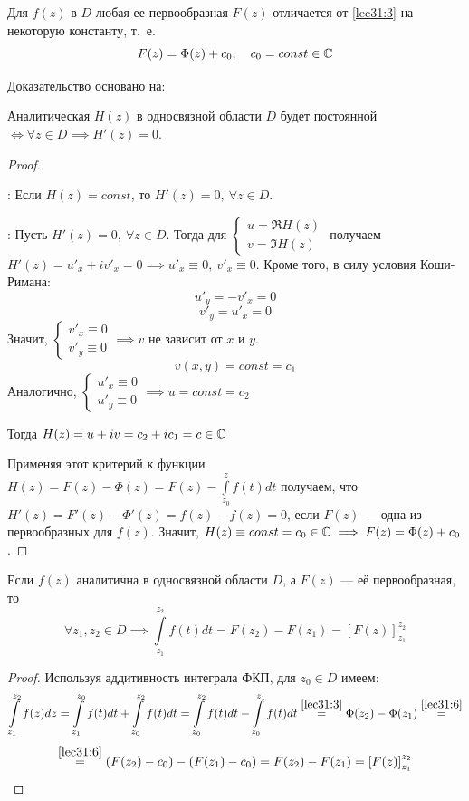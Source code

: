 \documentclass[../../main.tex]{subfiles}
\begin{document}
\begin{crl*}
	Для $ f(z) $ в $D$ любая ее первообразная $F(z)$ отличается от
	\eqref{lec31:3} на некоторую константу,
	т.~е.
	\begin{equation}
	\label{lec31:6}
		F(z) = \Phi(z) + c_0, \ \ \ c_0 = const \in \mathbb{C}
	\end{equation}
\end{crl*}
Доказательство основано на:
\begin{thm}
	Аналитическая $H(z)$ в односвязной области $D$ будет постоянной
	$\iff \forall z \in D \implies H'(z) = 0$.
\end{thm}
\begin{proof} ~

\nec:
Если $H(z) = const$, то $H'(z) = 0, \ \forall z \in D$.

\suff:
Пусть $H'(z) = 0, \ \forall z \in D$. Тогда для $\begin{cases}
	u = \Re H(z) \\
	v = \Im H(z)
\end{cases}$ получаем $H'(z) = u'_x + i v'_x = 0 \implies
u'_x \equiv 0, \ v'_x \equiv 0$. Кроме того, в силу условия Коши-Римана:
\[ u'_y = -v'_x = 0 \]
\[ v'_y = u'_x = 0 \]
Значит, $\begin{cases} v'_x \equiv 0 \\ v'_y \equiv 0
\end{cases} \implies v $ не зависит от $x$ и $y$.
\[ v(x, y) = const = c_1 \]
Аналогично, $\begin{cases} u'_x \equiv 0 \\ u'_y \equiv 0
\end{cases} \implies u = const = c_2 $

Тогда $H(z) = u + i v = c_2 + i c_1 = c \in \mathbb{C} $

Применяя этот критерий к функции $ H(z) = F(z) - \Phi(z) = F(z) -
\int\limits_{z_0}^z f(t) dt $ получаем, что $ H'(z) = F'(z) - \Phi ' (z) =
f(z) - f(z) = 0$, если $F(z)$ --- одна из первообразных для $f(z)$.
Значит, $H(z) \equiv const = c_0 \in \mathbb{C} \implies F(z) = \Phi(z) + c_0$.
\end{proof}
\begin{rem}
	Если $f(z)$ аналитична в односвязной области $D$, а $F(z)$ --- её
	первообразная, то
	\begin{equation}
		\label{lec31:7}
		\forall z_1, z_2 \in D \implies \int\limits_{z_1}^{z_2} f(t) dt =
		F(z_2) - F(z_1) = \left[ F(z) \right]_{z_1}^{z_2} 
	\end{equation}
\begin{proof}
	Используя аддитивность интеграла ФКП, для $z_0 \in D$ имеем:
	\[ \int\limits_{z_1}^{z_2} f(z) dz =
	\int\limits_{z_1}^{z_0} f(t) dt + \int\limits_{z_0}^{z_2} f(t) dt =
	\int\limits_{z_0}^{z_2} f(t) dt - \int\limits_{z_0}^{z_1} f(t) dt
	\stackrel{ \eqref{lec31:3} }{=} \Phi(z_2) - \Phi(z_1)
	\stackrel{ \eqref{lec31:6} }{=}
	\] \[
	\stackrel{ \eqref{lec31:6} }{=} (F(z_2) - c_0) - (F(z_1) - c_0) =
	F(z_2) - F(z_1) = \left[ F(z) \right]_{z_1}^{z_2}
	\]
\end{proof}
\end{rem}
\end{document}

